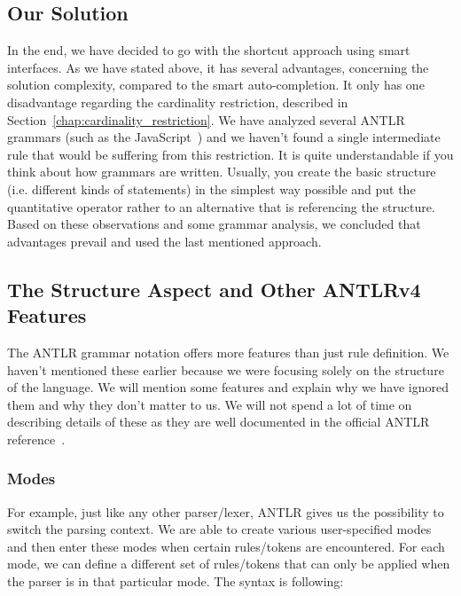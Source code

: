 \subsection{Our Solution}
\label{chap:structure_solution}

In the end, we have decided to go with the shortcut approach using smart interfaces.
As we have stated above, it has several advantages, concerning the solution complexity, compared to the smart auto-completion.
It only has one disadvantage regarding the cardinality restriction, described in Section~\ref{chap:cardinality_restriction}.
We have analyzed several ANTLR grammars (such as the JavaScript~\cite{javascript}) and we haven't found a single intermediate rule that would be suffering from this restriction.
It is quite understandable if you think about how grammars are written.
Usually, you create the basic structure (i.e. different kinds of statements) in the simplest way possible and put the quantitative operator rather to an alternative that is referencing the structure.
\\

Based on these observations and some grammar analysis, we concluded that advantages prevail and used the last mentioned approach.

\subsection{The Structure Aspect and Other ANTLRv4 Features}
\label{chap:antlr_features}

The ANTLR grammar notation offers more features than just rule definition.
We haven't mentioned these earlier because we were focusing solely on the structure of the language.
We will mention some features and explain why we have ignored them and why they don't matter to us.
We will not spend a lot of time on describing details of these as they are well documented in the official ANTLR reference~\cite{ANTLR4reference}.

\subsubsection{Modes}

For example, just like any other parser/lexer, ANTLR gives us the possibility to switch the parsing context.
We are able to create various user-specified modes and then enter these modes when certain rules/tokens are encountered.
For each mode, we can define a different set of rules/tokens that can only be applied when the parser is in that particular mode.
The syntax is following:

